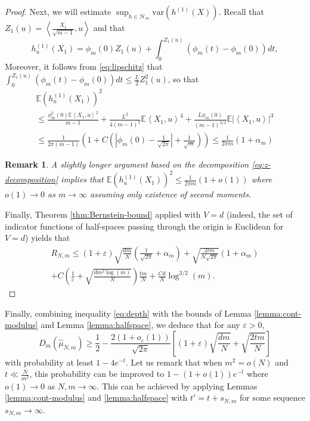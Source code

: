 \documentclass[12pt]{article}
\newcommand\var{\mathrm{var}}
\newcommand{\eps}{\varepsilon}
\newcommand{\wh}{\widehat}
\def\l{\left}
\def\r{\right}
\newcommand{\mb}{\mathbb}
\newcommand{\dotp}[2]{\left\langle#1,#2\right\rangle}
\theoremstyle{thmstyletwo}%
\newtheorem{remark}{Remark}%
\theoremstyle{thmstylethree}%
\begin{document}
\begin{proof}
Next, we will estimate $\sup_{h \in \mathcal{H}_m} \var(h^{(1)}(X))$. Recall that  $Z_1(u) = \dotp{\frac{X_1}{\sqrt{m-1}}}{u}$ and that 
    \[
    h_u^{(1)}(X_1) = \phi_m(0) Z_1(u) + \int_0^{Z_1(u)} (\phi_m(t) - \phi_m(0))dt,
    \]
Moreover, it follows from \eqref{eq:lipschitz} that $\int_0^{Z_1(u)} (\phi_m(t) - \phi_m(0))dt \leq \frac{L}{2} Z^2_1(u)$, so that 
\begin{multline*}
    \mb E \l(h_u^{(1)}(X_1)\r)^2 
    \\
    \leq \frac{\phi_m^2(0)\mb E\dotp{X_1}{u}^2}{m-1} + \frac{L^2}{4(m-1)^2}\mb E\dotp{X_1}{u}^4 + \frac{L\phi_m(0)}{(m-1)^{3/2}}\mb E\l|\dotp{X_1}{u} \r|^3 
    \\
    \leq\frac{1}{2\pi (m-1)} \l( 1 + C\l(\l|\phi_m(0)-\frac{1}{\sqrt{2\pi}}\r| + \frac{1}{\sqrt m}\r)\r) \leq \frac{1}{2\pi m} \l( 1 + \alpha_m\r)
\end{multline*} 
\begin{remark}
\label{remark:variance-simple}
    A slightly longer argument based on the decomposition \eqref{eq:z-decomposition} implies that $\mb E \l(h_u^{(1)}(X_1)\r)^2 \leq \frac{1}{2\pi m} \l( 1 + o(1)\r)$ where $o(1)\to 0$ as $m\to\infty$ assuming only existence of second moments.
\end{remark}
Finally, Theorem \ref{thm:Bernstein-bound} applied with $V=d$ (indeed, the set of indicator functions of half-spaces passing through the origin is Euclidean for $V=d$) yields that 
\begin{multline*}  
R_{N,m}\leq (1+\eps)\sqrt{\frac{dm}{N}}\l( \frac{1}{\sqrt{2\pi}} + \alpha_m\r) +
\sqrt{\frac{2tm}{N\sqrt{2\pi}}}\l( 1 + \alpha_m\r)
\\
+C\l(\frac{1}{\eps}+\sqrt{\frac{dm^2\log(m)}{N}}\r)\frac{tm}{N}
    +\frac{Cd}{N}\log^{3/2}(m).
\end{multline*}
\end{proof}
Finally, combining inequality \eqref{eq:depth} with the bounds of Lemma \ref{lemma:cont-modulus} and Lemma \ref{lemma:halfspace}, we deduce that for any $\eps>0$,
\begin{equation}
    \label{eq:depth-final}
D_m(\wh\mu_{N,m})\geq \frac12 - \frac{2(1+o_\eps(1))}{\sqrt{2\pi}}\l[(1+\eps)\sqrt{\frac{dm}{N}} +
    \sqrt{\frac{2tm}{N}} \r]
\end{equation}
with probability at least $1-4e^{-t}$. Let us remark that when $m^2=o(N)$ and $t\ll \frac{N}{m^2}$, this probability can be improved to $1-(1+o(1))e^{-t}$ where $o(1)\to 0$ as $N,m\to\infty$. This can be achieved by applying Lemmas \ref{lemma:cont-modulus} and \ref{lemma:halfspace} with $t'=t + s_{N,m}$ for some sequence $s_{N,m}\to\infty$. 
\end{document}
